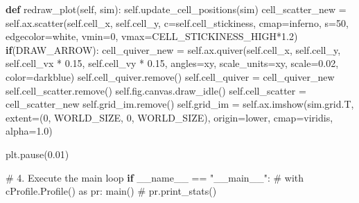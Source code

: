 \documentclass[
  letterpaper,
  DIV=11,
  numbers=noendperiod]{scrreprt}
\newenvironment{Shaded}{\begin{snugshade}}{\end{snugshade}}
\newcommand{\CommentTok}[1]{\textcolor[rgb]{0.37,0.37,0.37}{#1}}
\newcommand{\ControlFlowTok}[1]{\textcolor[rgb]{0.00,0.23,0.31}{\textbf{#1}}}
\newcommand{\DecValTok}[1]{\textcolor[rgb]{0.68,0.00,0.00}{#1}}
\newcommand{\FloatTok}[1]{\textcolor[rgb]{0.68,0.00,0.00}{#1}}
\newcommand{\KeywordTok}[1]{\textcolor[rgb]{0.00,0.23,0.31}{\textbf{#1}}}
\newcommand{\NormalTok}[1]{\textcolor[rgb]{0.00,0.23,0.31}{#1}}
\newcommand{\OperatorTok}[1]{\textcolor[rgb]{0.37,0.37,0.37}{#1}}
\newcommand{\StringTok}[1]{\textcolor[rgb]{0.13,0.47,0.30}{#1}}
\newcommand{\VariableTok}[1]{\textcolor[rgb]{0.07,0.07,0.07}{#1}}
\theoremstyle{definition}
\theoremstyle{remark}
\begin{document}
\begin{tcolorbox}
\begin{Shaded}
\begin{Highlighting}[]
    \KeywordTok{def}\NormalTok{ redraw\_plot(}\VariableTok{self}\NormalTok{, sim):}
        \VariableTok{self}\NormalTok{.update\_cell\_positions(sim)}
\NormalTok{        cell\_scatter\_new }\OperatorTok{=} \VariableTok{self}\NormalTok{.ax.scatter(}\VariableTok{self}\NormalTok{.cell\_x, }\VariableTok{self}\NormalTok{.cell\_y, c}\OperatorTok{=}\VariableTok{self}\NormalTok{.cell\_stickiness, cmap}\OperatorTok{=}\StringTok{\textquotesingle{}inferno\textquotesingle{}}\NormalTok{, s}\OperatorTok{=}\DecValTok{50}\NormalTok{, edgecolor}\OperatorTok{=}\StringTok{\textquotesingle{}white\textquotesingle{}}\NormalTok{, vmin}\OperatorTok{=}\DecValTok{0}\NormalTok{, vmax}\OperatorTok{=}\NormalTok{CELL\_STICKINESS\_HIGH}\OperatorTok{*}\FloatTok{1.2}\NormalTok{)}
        \ControlFlowTok{if}\NormalTok{(DRAW\_ARROW): }
\NormalTok{            cell\_quiver\_new }\OperatorTok{=} \VariableTok{self}\NormalTok{.ax.quiver(}\VariableTok{self}\NormalTok{.cell\_x, }\VariableTok{self}\NormalTok{.cell\_y, }\VariableTok{self}\NormalTok{.cell\_vx }\OperatorTok{*} \FloatTok{0.15}\NormalTok{, }\VariableTok{self}\NormalTok{.cell\_vy }\OperatorTok{*} \FloatTok{0.15}\NormalTok{, angles}\OperatorTok{=}\StringTok{\textquotesingle{}xy\textquotesingle{}}\NormalTok{, scale\_units}\OperatorTok{=}\StringTok{\textquotesingle{}xy\textquotesingle{}}\NormalTok{, scale}\OperatorTok{=}\FloatTok{0.02}\NormalTok{, color}\OperatorTok{=}\StringTok{\textquotesingle{}darkblue\textquotesingle{}}\NormalTok{)}
            \VariableTok{self}\NormalTok{.cell\_quiver.remove()}
            \VariableTok{self}\NormalTok{.cell\_quiver }\OperatorTok{=}\NormalTok{ cell\_quiver\_new}
        \VariableTok{self}\NormalTok{.cell\_scatter.remove()}
        \VariableTok{self}\NormalTok{.fig.canvas.draw\_idle()}
        \VariableTok{self}\NormalTok{.cell\_scatter }\OperatorTok{=}\NormalTok{ cell\_scatter\_new}
        \VariableTok{self}\NormalTok{.grid\_im.remove()}
        \VariableTok{self}\NormalTok{.grid\_im }\OperatorTok{=} \VariableTok{self}\NormalTok{.ax.imshow(sim.grid.T, extent}\OperatorTok{=}\NormalTok{(}\DecValTok{0}\NormalTok{, WORLD\_SIZE, }\DecValTok{0}\NormalTok{, WORLD\_SIZE), origin}\OperatorTok{=}\StringTok{\textquotesingle{}lower\textquotesingle{}}\NormalTok{, cmap}\OperatorTok{=}\StringTok{\textquotesingle{}viridis\textquotesingle{}}\NormalTok{, alpha}\OperatorTok{=}\FloatTok{1.0}\NormalTok{)}
        
\NormalTok{        plt.pause(}\FloatTok{0.01}\NormalTok{)}
            
            
\CommentTok{\# 4. Execute the main loop}
\ControlFlowTok{if} \VariableTok{\_\_name\_\_} \OperatorTok{==} \StringTok{"\_\_main\_\_"}\NormalTok{:}
    \CommentTok{\# with cProfile.Profile() as pr:}
\NormalTok{        main()}
        \CommentTok{\# pr.print\_stats()}


\end{Highlighting}
\end{Shaded}

\end{tcolorbox}
\end{document}
